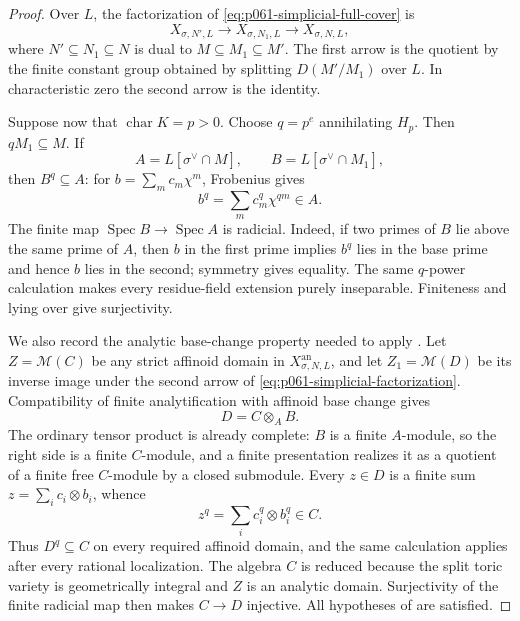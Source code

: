 \begin{proof}
Over \(L\), the factorization of \eqref{eq:p061-simplicial-full-cover} is
\begin{equation}
 \label{eq:p061-simplicial-factorization}
 X_{\sigma,N',L}\longrightarrow X_{\sigma,N_1,L}
                         \longrightarrow X_{\sigma,N,L},
\end{equation}
where \(N'\subseteq N_1\subseteq N\) is dual to
\(M\subseteq M_1\subseteq M'\).  The first arrow is the quotient by the
finite constant group obtained by splitting \(D(M'/M_1)\) over \(L\).
In characteristic zero the second arrow is the identity.

Suppose now that \(\operatorname{char}K=p>0\).  Choose
\(q=p^e\) annihilating \(H_p\).  Then \(qM_1\subseteq M\).  If
\[
 A=L[\sigma^\vee\cap M],
 \qquad B=L[\sigma^\vee\cap M_1],
\]
then \(B^q\subseteq A\): for
\(b=\sum_m c_m\chi^m\), Frobenius gives
\[
                         b^q=\sum_m c_m^q\chi^{qm}\in A.
\]
The finite map \(\operatorname{Spec}B\to\operatorname{Spec}A\) is
radicial.  Indeed, if two primes of \(B\) lie above the same prime of
\(A\), then \(b\) in the first prime implies \(b^q\) lies in the base prime
and hence \(b\) lies in the second; symmetry gives equality.  The same
\(q\)-power calculation makes every residue-field extension purely
inseparable.  Finiteness and lying over give surjectivity.

We also record the analytic base-change property needed to apply
.  Let \(Z=\mathcal M(C)\) be any
strict affinoid domain in \(X_{\sigma,N,L}^{\mathrm{an}}\), and let
\(Z_1=\mathcal M(D)\) be its inverse image under the second arrow of
\eqref{eq:p061-simplicial-factorization}.  Compatibility of finite
analytification with affinoid base change
\cite[Fact~4.1.16 and Definition~4.2.5]{Temkin2015Berkovich} gives
\begin{equation}
 \label{eq:p061-simplicial-affinoid-base-change}
                              D=C\otimes_A B.
\end{equation}
The ordinary tensor product is already complete: \(B\) is a finite
\(A\)-module, so the right side is a finite \(C\)-module, and a finite
presentation realizes it as a quotient of a finite free \(C\)-module by a
closed submodule.  Every \(z\in D\) is a finite sum
\(z=\sum_i c_i\otimes b_i\), whence
\[
                     z^q=\sum_i c_i^q\otimes b_i^q\in C.
\]
Thus \(D^q\subseteq C\) on every required affinoid domain, and the same
calculation applies after every rational localization.  The algebra \(C\)
is reduced because the split toric variety is geometrically integral and
\(Z\) is an analytic domain.  Surjectivity of the finite radicial map then
makes \(C\to D\) injective.  All hypotheses of
 are satisfied.


\end{proof}
